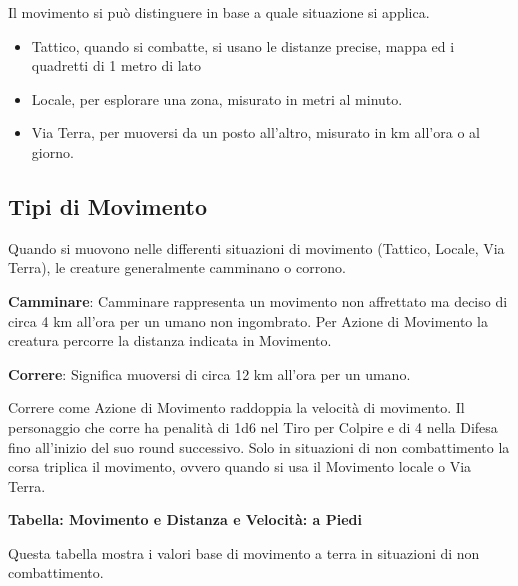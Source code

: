 \begin{multicols}{2}

Il movimento si può distinguere in base a quale situazione si applica.

\medskip

\begin{itemize}[leftmargin=*] \setlength{\itemsep}{0pt}
\item Tattico, quando si combatte, si usano le distanze precise, mappa ed i quadretti di 1 metro di lato
\item Locale, per esplorare una zona, misurato in metri al minuto.
\item Via Terra, per muoversi da un posto all'altro, misurato in km all'ora o al giorno.
\end{itemize}

\subsection{Tipi di Movimento}\label{tipodimovimento}\hypertarget{tipodimovimento}{}

Quando si muovono nelle differenti situazioni di movimento (Tattico, Locale, Via Terra), le creature generalmente camminano o corrono.

\textbf{Camminare}: Camminare rappresenta un movimento non affrettato ma deciso di circa 4 km all'ora per un umano non ingombrato. Per Azione di Movimento la creatura percorre la distanza indicata in Movimento.

\textbf{Correre}: Significa muoversi di circa 12 km all'ora per un umano.

Correre come Azione di Movimento raddoppia la velocità di movimento.
Il personaggio che corre ha penalità di 1d6 nel Tiro per Colpire e di 4 nella Difesa fino all'inizio del suo round successivo.
Solo in situazioni di non combattimento la corsa triplica il movimento, ovvero quando si usa il Movimento locale o Via Terra.

\textbf{Tabella: Movimento e Distanza e Velocità: a Piedi} 

Questa tabella mostra i valori base di movimento a terra in situazioni di non combattimento.

\medskip


\end{multicols}
